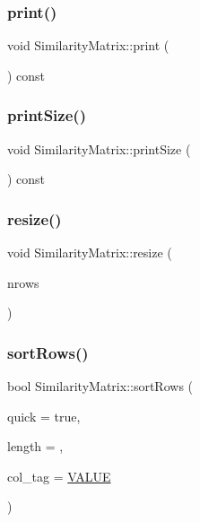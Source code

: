 \subsubsection{\texorpdfstring{print()}{print()}}
{\footnotesize\ttfamily void Similarity\+Matrix\+::print (\begin{DoxyParamCaption}\item[{std\+::ostream \&}]{ }\end{DoxyParamCaption}) const}

\mbox{\label{class_similarity_matrix_a02a975af5873db869f894891fa05e826}} 
\subsubsection{\texorpdfstring{print\+Size()}{printSize()}}
{\footnotesize\ttfamily void Similarity\+Matrix\+::print\+Size (\begin{DoxyParamCaption}\item[{std\+::ostream \&}]{ }\end{DoxyParamCaption}) const}

\mbox{\label{class_similarity_matrix_a53caceef5b63b494cdf5a8f4a19d6e32}} 
\subsubsection{\texorpdfstring{resize()}{resize()}}
{\footnotesize\ttfamily void Similarity\+Matrix\+::resize (\begin{DoxyParamCaption}\item[{size\+\_\+t}]{nrows }\end{DoxyParamCaption})}

\mbox{\label{class_similarity_matrix_ab19ea17143e530072b9d903f7721b873}} 
\subsubsection{\texorpdfstring{sort\+Rows()}{sortRows()}}
{\footnotesize\ttfamily bool Similarity\+Matrix\+::sort\+Rows (\begin{DoxyParamCaption}\item[{bool}]{quick = {\ttfamily true},  }\item[{size\+\_\+t}]{length = {},  }\item[{\mbox{\hyperlink{class_similarity_matrix_a79098014d74c2cf85f0dd8ad7fc4ac4f}{C\+O\+L\+\_\+\+T\+AG}}}]{col\+\_\+tag = {\ttfamily \mbox{\hyperlink{class_similarity_matrix_a79098014d74c2cf85f0dd8ad7fc4ac4faf5942e194b9ec347c132ae2211f3782c}{V\+A\+L\+UE}}} }\end{DoxyParamCaption})}



